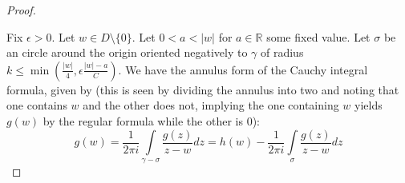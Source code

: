 \documentclass{article}
\newcommand{\bb}[1]{\mathbb{#1}}
\begin{document}
\begin{proof}
\begin{center}
\begin{tikzpicture}[x=0.75pt,y=0.75pt,yscale=-1,xscale=1]
\end{tikzpicture}

\end{center}

Fix $\epsilon >0$. Let $w\in D\setminus \{0\}$. Let $0< a < |w|$ for $a \in \bb{R}$ some fixed value. Let $\sigma$ be an circle around the origin oriented negatively to $\gamma$ of radius $k \leq \min(\frac{|w|}{4}, \epsilon \frac{|w| -a}{C})$. We have the annulus form of the Cauchy integral formula, given by (this is seen by dividing the annulus into two and noting that one contains $w$ and the other does not, implying the one containing $w$ yields $g(w)$ by the regular formula while the other is 0):
\[
  g(w) = \frac{1}{2\pi i}\int\limits_{\gamma - \sigma} \frac{g(z)}{z-w}dz = h(w) - \frac{1}{2\pi i}\int\limits_{\sigma} \frac{g(z)}{z-w}dz
\]


\end{proof}
\end{document}
